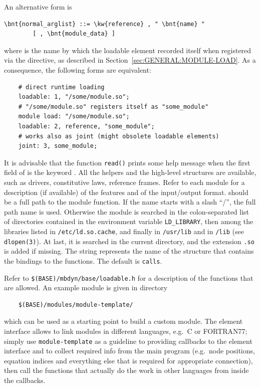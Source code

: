An alternative form is
\begin{Verbatim}[commandchars=\\\{\}]
    \bnt{normal_arglist} ::= \kw{reference} , " \bnt{name} "
        [ , \bnt{module_data} ]
\end{Verbatim}
where  is the name by which the loadable element recorded itself
when registered via the  directive, as described
in Section~\ref{sec:GENERAL:MODULE-LOAD}.
As a consequence, the following forms are equivalent:
\begin{verbatim}
    # direct runtime loading
    loadable: 1, "/some/module.so";
    # "/some/module.so" registers itself as "some_module"
    module load: "/some/module.so";
    loadable: 2, reference, "some_module";
    # works also as joint (might obsolete loadable elements)
    joint: 3, some_module;
\end{verbatim}

It is advisable that the function \texttt{read()} prints some help message
when the first field of  is the keyword .
All the helpers and the high-level structures are available, such as
drivers, constitutive laws, reference frames.
Refer to each module for a description (if available) of the features and of
the input/output format.
 should be a full path to the module function.
If the name starts with a slash ``/'', the full path name is used.
Otherwise the module is searched in the colon-separated list of directories 
contained in the environment variable \texttt{LD\_LIBRARY}, then among the
libraries listed in \texttt{/etc/ld.so.cache}, and finally in
\texttt{/usr/lib} and in \texttt{/lib} (see \texttt{dlopen(3)}).
At last, it is searched in the current directory, and the extension
\texttt{.so} is added if missing.
The string  represents the name of the structure that contains
the bindings to the functions.
The default is \texttt{calls}.

\noindent
Refer to \texttt{\$(BASE)/mbdyn/base/loadable.h} for a description of the
functions that are allowed.
An example module is given in directory
\begin{verbatim}
    $(BASE)/modules/module-template/
\end{verbatim}
which can be used as a starting point to build a custom module.
The  element interface allows to link modules in different
languages, e.g.\ C or FORTRAN77; simply use \texttt{module-template}
as a guideline to providing callbacks to the  element
interface and to collect required info from the main program
(e.g.\ node positions, equation indices and everything else that is
required for appropriate connection), then call the functions that
actually do the work in other languages from inside the callbacks.

